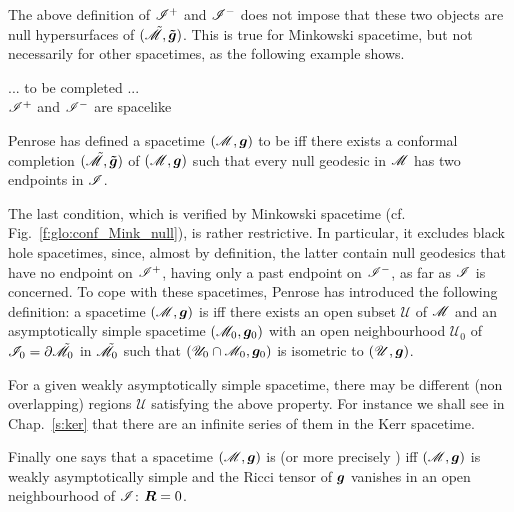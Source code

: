 \begin{remark}
The above definition of $\mathscr{I}^+$ and $\mathscr{I}^-$ does not impose
that these two objects are null hypersurfaces of $(\tilde{\mathscr{M}},\bm{\tilde{g}})$.
This is true for Minkowski spacetime, but not necessarily for other spacetimes,
as the following example shows.
\end{remark}

\begin{example}
... to be completed ... \\
$\mathscr{I}^+$ and $\mathscr{I}^-$ are spacelike
\end{example}


Penrose \cite{Penro64,Penro68} has defined
a spacetime $(\mathscr{M},\bm{g})$ to be  iff there exists
a conformal completion $(\tilde{\mathscr{M}},\bm{\tilde{g}})$
of $(\mathscr{M},\bm{g})$
such that every null geodesic in $\mathscr{M}$ has two endpoints in $\mathscr{I}$.

The last condition, which is verified by Minkowski spacetime (cf. Fig.~\ref{f:glo:conf_Mink_null}), is rather restrictive. In particular, it excludes
black hole spacetimes, since, almost by definition, the latter contain null
geodesics that have no endpoint on $\mathscr{I}^+$, having only a past endpoint
on $\mathscr{I}^-$, as far as $\mathscr{I}$ is concerned. To cope with these spacetimes,
Penrose \cite{Penro68} has introduced the following definition:
a spacetime $(\mathscr{M},\bm{g})$ is
 iff
there exists an open subset $\mathscr{U}$ of $\mathscr{M}$ and
an asymptotically simple spacetime $(\mathscr{M}_0, \bm{g}_0)$
with an open neighbourhood $\mathscr{U}_0$ of $\mathscr{I}_0 = \partial \tilde{\mathscr{M}}_0$
in $\tilde{\mathscr{M}}_0$ such that $(\mathscr{U}_0\cap \mathscr{M}_0,\bm{g}_0)$ is
isometric to $(\mathscr{U},\bm{g})$.

\begin{remark}
For a given weakly asymptotically simple spacetime, there may be different
(non overlapping) regions $\mathscr{U}$ satisfying the above property.
For instance we shall see in Chap.~\ref{s:ker}
that there are an infinite series of them in the Kerr spacetime.
\end{remark}

Finally one says that a spacetime $(\mathscr{M},\bm{g})$ is
(or more precisely  \cite{HawkiE73})
iff $(\mathscr{M},\bm{g})$ is weakly asymptotically simple and the Ricci tensor of
$\bm{g}$ vanishes in an open neighbourhood of $\mathscr{I}$: $\bm{R} = 0$.

